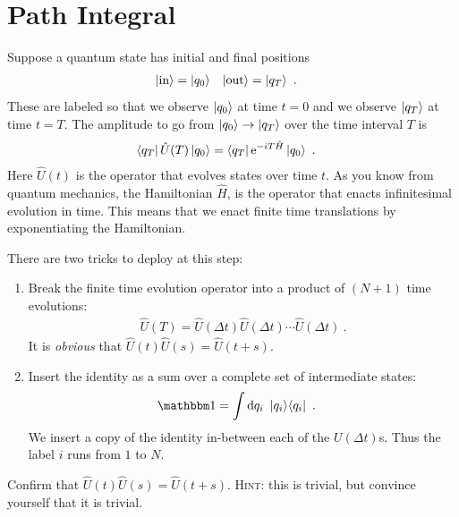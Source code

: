 \documentclass[12pt, oneside]{report}    %
\let\oldsection\section
\def\section{%
  \setcounter{sidenote}{1}%
  \oldsection
}
\begin{document}
\section{Path Integral}
Suppose a quantum state has initial and final positions
\begin{align}
    \left|\textnormal{in}\right\rangle &= \left|q_0\right\rangle
    &
    \left|\textnormal{out}\right\rangle &= \left|q_T\right\rangle \ .
\end{align}
These are labeled so that we observe $\left|q_0\right\rangle$ at time $t=0$ and we observe $\left|q_T\right\rangle$ at time $t=T$. The amplitude to go from $\left|q_0\right\rangle \to \left|q_T\right\rangle$ over the time interval $T$ is
\begin{align}
    \left\langle q_T\right| \hat U(T) \left|q_0\right\rangle &= \left\langle q_T\right| \operatorname{e}^{-iT\hat H} \left|q_0\right\rangle \ .
\end{align}
Here $\hat U(t)$ is the operator that evolves states over time $t$. As you know from quantum mechanics, the Hamiltonian $\hat H$, is the operator that enacts infinitesimal evolution in time. This means that we enact finite time translations by exponentiating the Hamiltonian.

There are two tricks to deploy at this step:
\begin{enumerate}
    \item Break the finite time evolution operator into a product of $(N+1)$ time evolutions:
    \begin{align}
        \hat U(T) = \hat U(\Delta t)\hat U(\Delta t)\cdots \hat U(\Delta t) \ .
    \end{align}
    It is \emph{obvious} that $\hat U(t)\hat U(s) = \hat U(t+s)$.
    \item Insert the identity as a sum over a complete set of intermediate states:
    \begin{align}
        \one &= \int \D{q_i}\, \ket{q_i}\!\bra{q_i} \ .
    \end{align}
    We insert a copy of the identity in-between each of the $U(\Delta t)$s. Thus the label $i$ runs from $1$ to $N$.
\end{enumerate}
\begin{exercise}
Confirm that $\hat U(t)\hat U(s) = \hat U(t+s)$. \textsc{Hint}: this is trivial, but convince yourself that it is trivial.
\end{exercise}
\end{document}
